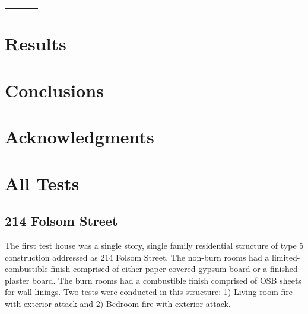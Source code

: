 \documentclass[12pt,oneside]{book}
\begin{document}
\begin{table}
\begin{tabular}{llcc}
\noalign{\smallskip}\hline
\end{tabular}
\label{tab:Fuel_Masses}
\end{table}

\chapter{Results}
\label{chap:Results}


\clearpage


\chapter{Conclusions}
\label{chap:Conclusions}

\chapter{Acknowledgments}
\label{chap:Acknowledgments}



\appendix

\chapter{All Tests}

\section{214 Folsom Street}

The first test house was a single story, single family residential structure of type 5 construction addressed as 214 Folsom Street. The non-burn rooms had a limited-combustible finish comprised of either paper-covered gypsum board or a finished plaster board. The burn rooms had a combustible finish comprised of OSB sheets for wall linings. Two tests were conducted in this structure: 1) Living room fire with exterior attack and 2) Bedroom fire with exterior attack.
\end{document}
